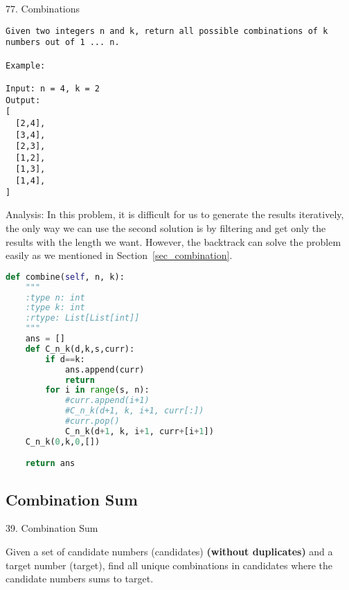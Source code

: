 \documentclass[../../question_3_array_question.tex]{subfiles}
\begin{document}
77. Combinations
\begin{lstlisting}
Given two integers n and k, return all possible combinations of k numbers out of 1 ... n.

Example:

Input: n = 4, k = 2
Output:
[
  [2,4],
  [3,4],
  [2,3],
  [1,2],
  [1,3],
  [1,4],
]
\end{lstlisting}
Analysis: In this problem, it is difficult for us to generate the results iteratively, the only way we can use the second solution is by filtering and get only the results with the length we want. However, the backtrack can solve the problem easily as we mentioned in Section~\ref{sec_combination}.
\begin{lstlisting}[language=Python]
def combine(self, n, k):
    """
    :type n: int
    :type k: int
    :rtype: List[List[int]]
    """
    ans = []
    def C_n_k(d,k,s,curr):
        if d==k:
            ans.append(curr)
            return
        for i in range(s, n):
            #curr.append(i+1)
            #C_n_k(d+1, k, i+1, curr[:])
            #curr.pop()
            C_n_k(d+1, k, i+1, curr+[i+1])
    C_n_k(0,k,0,[]) 

    return ans
\end{lstlisting}
\subsection{Combination Sum}
39. Combination Sum

Given a set of candidate numbers (candidates) \textbf{(without duplicates)} and a target number (target), find all unique combinations in candidates where the candidate numbers sums to target.
\end{document}

